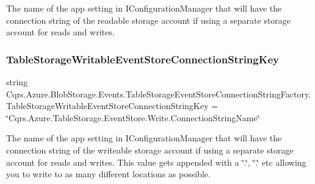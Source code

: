 The name of the app setting in I\+Configuration\+Manager that will have the connection string of the readable storage account if using a separate storage account for reads and writes. 

\mbox{\label{classCqrs_1_1Azure_1_1BlobStorage_1_1Events_1_1TableStorageEventStoreConnectionStringFactory_a73df7618d5978a2c0d2e69880b799369_a73df7618d5978a2c0d2e69880b799369}} 
\subsubsection{\texorpdfstring{Table\+Storage\+Writable\+Event\+Store\+Connection\+String\+Key}{TableStorageWritableEventStoreConnectionStringKey}}
{\footnotesize\ttfamily string Cqrs.\+Azure.\+Blob\+Storage.\+Events.\+Table\+Storage\+Event\+Store\+Connection\+String\+Factory.\+Table\+Storage\+Writable\+Event\+Store\+Connection\+String\+Key = \char`\"{}Cqrs.\+Azure.\+Table\+Storage.\+Event\+Store.\+Write.\+Connection\+String\+Name\char`\"{}\hspace{0.3cm}{\ttfamily [static]}}



The name of the app setting in I\+Configuration\+Manager that will have the connection string of the writeable storage account if using a separate storage account for reads and writes. This value gets appended with a \char`\"{}.\char`\"{}, \char`\"{}.\char`\"{} etc allowing you to write to as many different locations as possible. 



